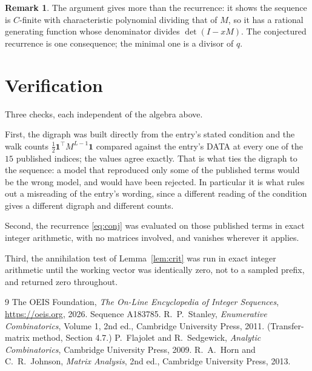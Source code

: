 \documentclass[11pt,a4paper]{article}
\theoremstyle{plain}
\theoremstyle{definition}
\newtheorem{remark}[theorem]{Remark}
\begin{document}
\begin{remark}
The argument gives more than the recurrence: it shows the sequence is $C$-finite with
characteristic polynomial dividing that of $M$, so it has a rational generating function
whose denominator divides $\det(I-xM)$. The conjectured recurrence is one consequence; the
minimal one is a divisor of $q$.
\end{remark}

\section{Verification}

Three checks, each independent of the algebra above.

First, the digraph was built directly from the entry's stated condition and the walk counts
$\tfrac1{2}\mathbf{1}^{\!\top}M^{L-1}\mathbf{1}$ compared against the entry's DATA at
every one of the $15$ published indices; the values agree exactly. That is what ties
the digraph to the sequence: a model that reproduced only some of the published terms would
be the wrong model, and would have been rejected. In particular it is what rules out a
misreading of the entry's wording, since a different reading of the condition gives a
different digraph and different counts.

Second, the recurrence \eqref{eq:conj} was evaluated on those published terms in exact
integer arithmetic, with no matrices involved, and vanishes wherever it applies.

Third, the annihilation test of Lemma~\ref{lem:crit} was run in exact integer arithmetic
until the working vector was identically zero, not to a sampled prefix, and returned zero
throughout.

\begin{thebibliography}{9}
 The OEIS Foundation, \emph{The On-Line Encyclopedia of Integer
Sequences}, \url{https://oeis.org}, 2026. Sequence A183785.
 R.~P.~Stanley, \emph{Enumerative Combinatorics}, Volume 1, 2nd ed.,
Cambridge University Press, 2011. (Transfer-matrix method, Section 4.7.)
 P.~Flajolet and R.~Sedgewick, \emph{Analytic Combinatorics}, Cambridge
University Press, 2009.
 R.~A.~Horn and C.~R.~Johnson, \emph{Matrix Analysis}, 2nd ed., Cambridge
University Press, 2013.
\end{thebibliography}
\end{document}

